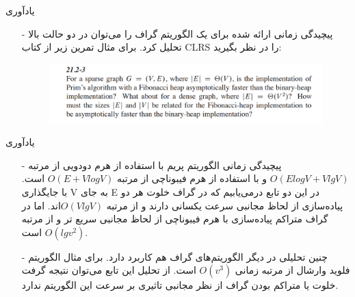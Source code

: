 \begin{frame}{يادآوری}
\begin{itemize}\itemr
\item[-]
پیچیدگی زمانی ارائه شده برای یک الگوریتم گراف را می‌توان در دو حالت بالا تحلیل کرد. برای مثال تمرین زیر از کتاب CLRS را در نظر بگیرید:

\begin{figure}[h!]
\centering
\includegraphics[width=\textwidth]{figs/chap02/2.png}
\end{figure}

\end{itemize}
\end{frame}

\begin{frame}{يادآوری}
\begin{itemize}\itemr
\item[-]
پیچیدگی زمانی الگوریتم پریم با استفاده از هرم دودویی از مرتبه $ O(E logV+V lgV)$ و با استفاده از هرم فیبوناچی از مرتبه $O(E+V logV)$ است. با جایگذاری V به جای E  در این دو تابع درمی‌یابیم که در گراف خلوت هر دو پیاده‌سازی‌ از لحاظ مجانبی سرعت یکسانی دارند و از مرتبه $O(Vlg V)$اند. اما در گراف متراکم پیاده‌سازی با هرم فیبوناچی از لحاظ مجانبی سریع تر و از مرتبه $O(lgv^2)$ است.
\item[-]
چنین تحلیلی در دیگر الگوریتم‌‌های گراف هم کاربرد دارد. برای مثال الگوریتم فلوید وارشال از مرتبه زمانی $O(v^3)$ است. از تحلیل این تابع می‌توان نتیجه گرفت خلوت یا متراکم بودن گراف از نظر مجانبی تاثیری بر سرعت این الگوریتم ندارد.
\end{itemize}
\end{frame}



